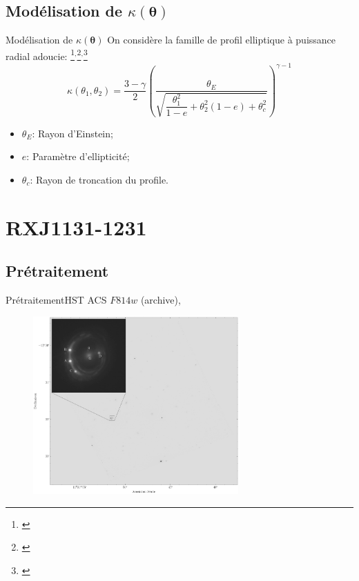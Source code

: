 \documentclass{beamer}
\begin{document}
\subsection{Modélisation de $\kappa(\boldsymbol{ \theta} )$}
\begin{frame}{Modélisation de $\kappa(\boldsymbol{ \theta} )$}
On considère la famille de profil elliptique à puissance radial adoucie:
\footnote{\citet{Barkana1998}}$^{,}$\footnote{\citet{Suyu2013}}$^{,}$\footnote{\citet{Keeton2001}}
\begin{equation}\label{eq:Kappa} 
        \kappa(\theta_1, \theta_2) = \frac{3 - \gamma}{2} 
        \left( \frac{\theta_E}{\sqrt{\dfrac{\theta_1^2}{1 - e} + \theta_2^2(1-e) + 
        \theta_c^2}} \right)^{\gamma-1}
\end{equation} 
\begin{itemize}
        \item $\theta_E$: Rayon d'Einstein;
        \item $e$: Paramètre d'ellipticité;
        \item $\theta_c$: Rayon de troncation du profile.
\end{itemize}
\end{frame}

\section{RXJ1131-1231}
\subsection{Prétraitement}
\begin{frame}{Prétraitement}{HST ACS $F814w$ (archive), \citet{Sluse2003}}
        \begin{figure}[H]
                \centering
                \includegraphics[width=0.7\textwidth]{wide_field_and_zoom}
        \end{figure}
\end{frame}
\end{document}
